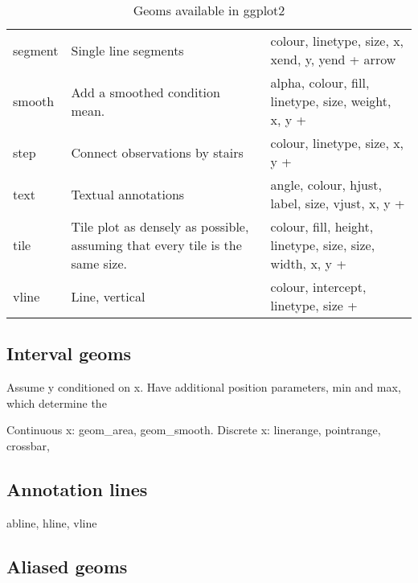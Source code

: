 \begin{table}
\begin{center}
\begin{tabular}{lp{2.5in}p{2.5in}}
    segment      & Single line segments                                                          & colour, linetype, size, x, xend, y, yend + arrow                                     \\
    smooth       & Add a smoothed condition mean.                                                & alpha, colour, fill, linetype, size, weight, x, y +                                  \\
    step         & Connect observations by stairs                                                & colour, linetype, size, x, y +                                                       \\
    text         & Textual annotations                                                           & angle, colour, hjust, label, size, vjust, x, y +                                     \\
    tile         & Tile plot as densely as possible, assuming that every tile is the same size.  & colour, fill, height, linetype, size, size, width, x, y +                            \\
    vline        & Line, vertical                                                                & colour, intercept, linetype, size +                                                  \\
    \bottomrule
  \end{tabular}
  \end{center}
  \caption{Geoms available in ggplot2}
  \label{tbl:geoms}
\end{table}

\subsection{Interval geoms}
\label{sub:geom_interval}

Assume y conditioned on x.  Have additional position parameters, min and max, which determine the 

Continuous x: geom\_area, geom\_smooth.  Discrete x: linerange, pointrange, crossbar, 

\subsection{Annotation lines}
\label{sub:geom_abhvline}

abline, hline, vline

\subsection{Aliased geoms}
\label{sub:geom_aliased}

